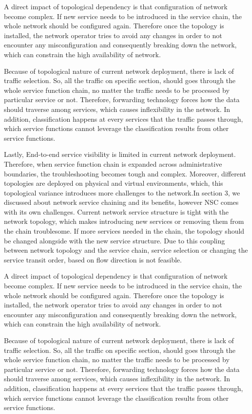 A direct impact of topological dependency is that configuration of network become complex. If new service needs to be introduced in the service chain, the whole network should be configured again. Therefore once the topology is installed, the network operator tries to avoid any changes in order to not encounter any misconfiguration and consequently breaking down the network, which can constrain the high availability of network.

Because of topological nature of current network deployment, there is lack of traffic selection. So, all the traffic on specific section, should goes through the whole service function chain, no matter the traffic needs to be processed by particular service or not. Therefore, forwarding technology forces how the data should  traverse among services, which causes inflexibility in the network. In addition, classification happens at every services that the traffic passes through, which service functions cannot leverage the classification results from other service functions. 

Lastly, End-to-end service visibility is limited in current network deployment. Therefore, when service function chain is expanded across administrative boundaries, the troubleshooting becomes tough and complex. Moreover, different topologies are deployed on physical and virtual environments, which, this topological variance introduces more challenges to the network.In section 3, we discussed about network service chaining and its benefits, however NSC comes with its own challenges. Current network service structure is tight with the network topology, which makes introducing new services or removing them from the chain troublesome. If more services needed in the chain, the topology should be changed alongside with the new service structure. Due to this coupling between network topology and the service chain, service selection or changing the service transit order, based on flow direction is not feasible. \cite{QN14}

A direct impact of topological dependency is that configuration of network become complex. If new service needs to be introduced in the service chain, the whole network should be configured again. Therefore once the topology is installed, the network operator tries to avoid any changes in order to not encounter any misconfiguration and consequently breaking down the network, which can constrain the high availability of network.

Because of topological nature of current network deployment, there is lack of traffic selection. So, all the traffic on specific section, should goes through the whole service function chain, no matter the traffic needs to be processed by particular service or not. Therefore, forwarding technology forces how the data should  traverse among services, which causes inflexibility in the network. In addition, classification happens at every services that the traffic passes through, which service functions cannot leverage the classification results from other service functions. 

